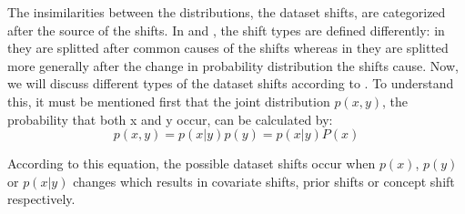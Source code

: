 The insimilarities between the distributions, the dataset shifts, are categorized after the source of the shifts. In \cite{shiftinML} and \cite{shiftDataset}, the shift types are defined differently: in \cite{shiftinML} they are splitted after common causes of the shifts whereas in \cite{shiftDataset} they are splitted more generally after the change in probability distribution the shifts cause. Now, we will discuss different types of the dataset shifts according to \cite{shiftDataset}. To understand this, it must be mentioned first that the joint distribution $p(x, y)$, the probability that both x and y occur, can be calculated by:
	\begin{equation}\label{eq:jointXY}
			p(x, y) = p(x | y)p(y) = p(x | y)P(x)
	\end{equation}

According to this equation, the possible dataset shifts occur when $p(x)$, $p(y)$ or $p(x|y)$ changes which results in covariate shifts, prior shifts or concept shift respectively. 

